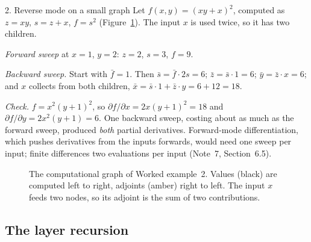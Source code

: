 \documentclass[11pt]{article}
\begin{document}
\begin{worked}{2. Reverse mode on a small graph}
Let $f(x, y) = (xy + x)^2$, computed as $z = xy$, $s = z + x$, $f = s^2$ (Figure~\ref{fig:graph}). The input $x$ is
used twice, so it has two children.

\emph{Forward sweep} at $x = 1$, $y = 2$: $z = 2$, $s = 3$, $f = 9$.

\emph{Backward sweep.} Start with $\bar{f} = 1$. Then $\bar{s} = \bar{f}\cdot 2s = 6$; $\bar{z} = \bar{s} \cdot 1 = 6$;
$\bar{y} = \bar{z}\cdot x = 6$; and $x$ collects from both children, $\bar{x} = \bar{s}\cdot 1 + \bar{z}\cdot y = 6 + 12 = 18$.

\emph{Check.} $f = x^2(y + 1)^2$, so $\partial f/\partial x = 2x(y + 1)^2 = 18$ and $\partial f/\partial y = 2x^2(y + 1) = 6$.
One backward sweep, costing about as much as the forward sweep, produced \emph{both} partial derivatives. Forward-mode
differentiation, which pushes derivatives from the inputs forwards, would need one sweep per input; finite differences
two evaluations per input (Note~7, Section~6.5).
\end{worked}

\begin{figure}[htbp]
\centering
{}
\caption{The computational graph of Worked example~2. Values (black) are computed left to right, adjoints (amber)
right to left. The input $x$ feeds two nodes, so its adjoint is the sum of two contributions.}
\label{fig:graph}
\end{figure}

\subsection{The layer recursion}\label{sec:recursion}
\end{document}
